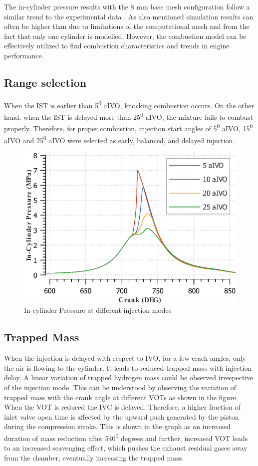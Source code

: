\documentclass[conference]{IEEEtran}
\begin{document}
The in-cylinder pressure results with the 8 mm base mesh configuration follow a similar trend to the experimental data \cite{b10}.
As \cite{b4} also mentioned simulation results can often be higher than due to limitations of the computational mesh and from the fact that only one cylinder is modelled.
However, the combustion model can be effectively utilized to find combustion characteristics and trends in engine performance.

\subsection{Range selection}
When the IST is earlier than 5\textsuperscript{0} aIVO, knocking combustion occurs.
On the other hand, when the IST is delayed more than 25\textsuperscript{0} aIVO, the mixture fails to combust properly.
Therefore, for proper combustion, injection start angles of 5\textsuperscript{0} aIVO, 15\textsuperscript{0} aIVO and 25\textsuperscript{0} aIVO were selected as early, balanced, and delayed injection.

\begin{figure}[htbp]
    \centerline{\includegraphics{plots and graphs/2.png}}
    \caption{In-cylinder Pressure at different injection modes}
    \label{plt_2}
    \end{figure}


\subsection{Trapped Mass}
When the injection is delayed with respect to IVO, for a few crack angles, only the air is flowing to the cylinder.
It leads to reduced trapped mass with injection delay.
A linear variation of trapped hydrogen mass could be observed irrespective of the injection mode.
This can be understood by observing the variation of trapped mass with the crank angle at different VOTs as shown in the figure.
When the VOT is reduced the IVC is delayed.
Therefore, a higher fraction of inlet valve open time is affected by the upward push generated by the piston during the compression stroke.
This is shown in the graph as an increased duration of mass reduction after 540\textsuperscript{0} degrees and further, increased VOT leads to an increased scavenging effect, which pushes the exhaust residual gases away from the chamber, eventually increasing the trapped mass.
\end{document}
